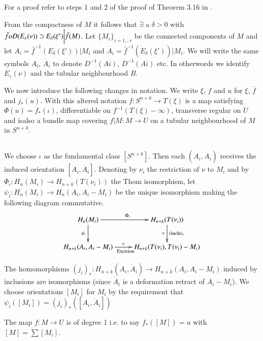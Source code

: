 For a proof refer to steps 1 and 2 of the proof of Theorem 3.16
in \cite{c1:key4}. 
    
From the compactness of $M$ it follows that $\exists$ a $\delta > 0$
with $\bar{f} o D\break(E_\varepsilon(\nu))\supset E_\delta (\xi')
\bigg|\bar{f}(M)$. Let $\{M_i\}_{i=1, , r}$ be the connected
components of $M$ and let $A_i=\bar{f}^{-1}(E_\delta(\xi'))\bigg|M_i$
and $\dot{A}_i = \bar{f}^{-1}(\dot{E}_\delta(\xi'))\bigg|M_i$. We will
write the same symbols $A_i$, $\dot{A_i}$ to denote $D^{-1}(Ai)$,
$D^{-1}(Ai)$ etc. In otherwords we identify $E_\varepsilon(\nu)$ and the
tubular neighbourhood $B$. 
     
We now introduce the following changes in notation. We write $\xi$,
$f$ and $u$ for $\xi$, $\bar{f}$ and $j_*(u)$. With this altered
notation $f: S^{n+k}\to T(\xi)$ is a map satisfying $\Phi (u) =
f_*(\iota)$, differentiable on $f^{-1}(T(\xi)-\infty)$, transverse
regular on $U$ and is\pageoriginale also a bundle map covering 
$f\bigg|M : M \to U$ on a tubular neighbourhood of $M$ in $S^{n+k}$.  
     
 \subsection{}%
 We choose $\iota$ as the fundamental class
 $\left[S^{n+k}\right]$. Then each $(A_i, \dot{A_i})$ receives the
 induced orientation $\left[A_i, \dot{A_i}\right]$. Denoting by
 $\nu_i$ the restriction of $\nu$ to $M_i$ and by $\Phi_i :
 H_n(M_i)\to H_{n+k}(T(\nu_i))$ the Thom isomorphism, let $\psi_i:H_n
 (M_i)\to H_n(A_i,A_i -M_i)$ be the unique isomorphism making the
 following diagram commutative. 
\[
\xymatrix{
H_n (M_i) \ar[r]^{\Phi_i} \ar[d]_{\psi_i} & H_{n+k} (T (\nu_i))
\ar[d]^{\rm(incln)_*}_\approx\\
H_{n+k} (A_i, A_i - M_i) \ar[r]^>>>>>{\approx}_>>>>{\rm Excision} & H_{n+k}
(T(\nu_i), T (\nu_i) - M_i)
}
\]     
     
The homomorphisms $(j_i)_* : H_{n+k}(A_i, \dot{A}_i)\to H_{n+k}(A_i,
A_i - M_i)$ induced by inclusions are isomorphisms (since $\dot{A}_i$ is a
deformation retract of $A_i-M_i$). We choose orientations
$\left[M_i\right]$ for $M_i$ by the requirement that
$\psi_i(\left[M_i\right])=(j_i)_*\left(\left[A_i, \dot{A}_i\right]
\right)$ 
     
\setcounter{lemma}{3}
\begin{lemma}\label{chap1:lem2.4}%
The map $f:M\to U$ is of degree 1 i.e. to say
$f_*(\left[M\right])=u$ with $\left[ M \right ] = \sum [M_i]$. 
\end{lemma} 
         
